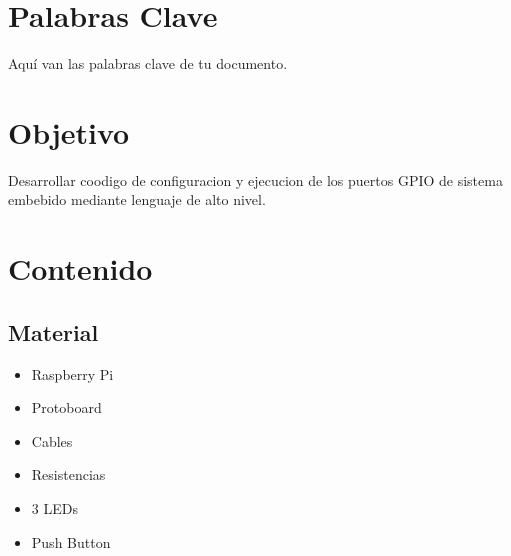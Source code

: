 \documentclass[12pt]{report}
\begin{document}
\tableofcontents
\newpage

\chapter*{Palabras Clave}
Aquí van las palabras clave de tu documento.
\newpage

\chapter*{Objetivo}
Desarrollar coodigo de configuracion y ejecucion de los puertos GPIO de sistema embebido mediante lenguaje de alto nivel.

\newpage

\chapter{Contenido}
\section{Material}
\begin{itemize}
    \item Raspberry Pi
    \item Protoboard
    \item Cables
    \item Resistencias
    \item 3 LEDs
    \item Push Button
\end{itemize}
\newpage
\end{document}
